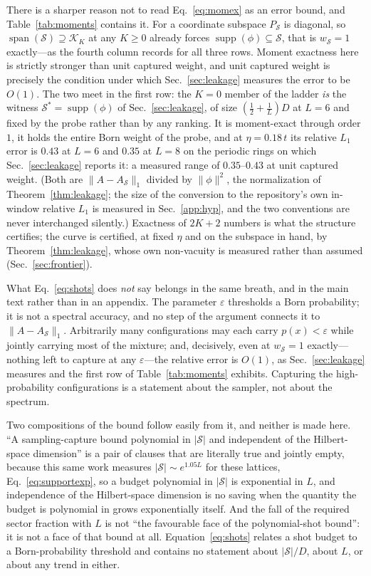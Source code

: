 There is a sharper reason not to read Eq.~\eqref{eq:momex} as an error bound, and
Table~\ref{tab:moments} contains it. For a coordinate subspace $P_{\mathcal S}$ is diagonal, so
$\operatorname{span}(\mathcal S)\supseteq\mathcal K_K$ at any $K\ge0$ already forces
$\operatorname{supp}(\phi)\subseteq\mathcal S$, that is $w_{\mathcal S}=1$ exactly---as the fourth
column records for all three rows. Moment exactness here is strictly stronger than unit captured
weight, and unit captured weight is precisely the condition under which Sec.~\ref{sec:leakage} measures
the error to be $O(1)$. The two meet in the first row: the $K=0$ member of the ladder \emph{is} the
witness $\mathcal S^{\ast}=\operatorname{supp}(\phi)$ of Sec.~\ref{sec:leakage}, of size $(\tfrac12+\tfrac1L)D$ at $L=6$ and fixed by the probe rather than by any ranking. It is moment-exact through
order $1$, it holds the entire Born weight of the probe, and at $\eta=0.18\,t$ its relative $L_1$ error
is $0.43$ at $L=6$ and $0.35$ at $L=8$ on the periodic rings on which Sec.~\ref{sec:leakage} reports it: a
measured range of $0.35$--$0.43$ at unit captured weight. (Both are $\lVert A-A_{\mathcal S}\rVert_1$
divided by $\lVert\phi\rVert^{2}$, the normalization of Theorem~\ref{thm:leakage}; the size of the
conversion to the repository's own in-window relative $L_1$ is measured in
Sec.~\ref{app:hyp}, and the two conventions are never interchanged silently.) Exactness of $2K+2$ numbers is
what the structure certifies; the curve is certified, at fixed $\eta$ and on the subspace in hand, by
Theorem~\ref{thm:leakage}, whose own non-vacuity is measured rather than assumed
(Sec.~\ref{sec:frontier}).

What Eq.~\eqref{eq:shots} does \emph{not} say belongs in the same breath, and in the main text rather
than in an appendix. The parameter $\varepsilon$ thresholds a Born probability; it is not a spectral
accuracy, and no step of the argument connects it to $\lVert A-A_{\mathcal S}\rVert_{1}$. Arbitrarily
many configurations may each carry $p(x)<\varepsilon$ while jointly carrying most of the mixture; and,
decisively, even at $w_{\mathcal S}=1$ exactly---nothing left to capture at any $\varepsilon$---the
relative error is $O(1)$, as Sec.~\ref{sec:leakage} measures and the first row of
Table~\ref{tab:moments} exhibits. Capturing the high-probability configurations is a statement about
the sampler, not about the spectrum.

Two compositions of the bound follow easily from it, and neither is made here. ``A sampling-capture
bound polynomial in $|\mathcal S|$ and independent of the Hilbert-space dimension'' is a pair of
clauses that are literally true and jointly empty, because this same work
measures $|\mathcal S|\sim e^{1.05L}$ for these lattices, Eq.~\eqref{eq:supportexp}, so a budget
polynomial in $|\mathcal S|$ is exponential in $L$, and independence of the Hilbert-space dimension is
no saving when the quantity the budget is polynomial in grows exponentially itself. And the fall of the
required sector fraction with $L$ is not ``the favourable face of the
polynomial-shot bound'': it is not a face of that bound at all. Equation~\eqref{eq:shots} relates a
shot budget to a Born-probability threshold and contains no statement about $|\mathcal S|/D$, about
$L$, or about any trend in either.

